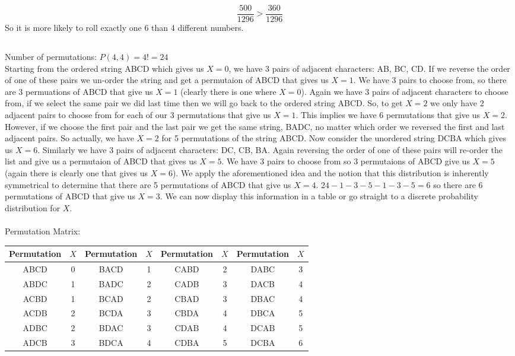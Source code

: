 \documentclass[]{article}
\begin{document}
$$ \frac{500}{1296} > \frac{360}{1296}$$
So it is more likely to roll exactly one 6 than 4 different numbers.
\subsection{}
Number of permutations: $P(4,4) = 4! = 24$ \\
Starting from the ordered string ABCD which gives us $X=0$, we have 3 pairs of adjacent characters: AB, BC, CD. If we reverse the order of one of these pairs we un-order the string and get a permutaion of ABCD that gives us $X = 1$. We have 3 pairs to choose from, so there are 3 permuations of ABCD that give us $X=1$ (clearly there is one where $X=0$). Again we have 3 pairs of adjacent characters to choose from, if we select the same pair we did last time then we will go back to the ordered string ABCD. So, to get $X=2$ we only have 2 adjacent pairs to choose from for each of our 3 permutations that give us $X=1$. This implies we have 6 permutations that give us $X=2$. However, if we choose the first pair and the last pair we get the same string, BADC, no matter which order we reversed the first and last adjacent pairs. So actually, we have $X=2$ for 5 permutations of the string ABCD. Now consider the unordered string DCBA which gives us $X=6$. Similarly we have 3 pairs of adjacent characters: DC, CB, BA. Again reversing the order of one of these pairs will re-order the list and give us a permutaion of ABCD that gives us $X=5$. We have 3 pairs to choose from so 3 permutaions of ABCD give us $X=5$ (again there is clearly one that gives us $X=6$). We apply the aforementioned idea and the notion that this distribution is inherently symmetrical to determine that there are 5 permutations of ABCD that give us $X=4$. $24 - 1 - 3 - 5 - 1 - 3 -5 = 6$ so there are 6 permutations of ABCD that give us $X=3$. We can now display this information in a table or go straight to a discrete probability distribution for $X$.
\\
\\
Permutation Matrix:
\begin{center}
\begin{tabular}{|c|c|c|c|c|c|c|c|}
	\hline
	Permutation & $X$ & Permutation & $X$ & Permutation & $X$ & Permutation & $X$ \\
	\hline
	ABCD & 0 & BACD & 1 & CABD & 2 & DABC & 3  \\
	\hline
	ABDC & 1 & BADC & 2 & CADB & 3 & DACB & 4  \\
	\hline
	ACBD & 1 & BCAD & 2 & CBAD & 3 & DBAC & 4  \\
	\hline
	ACDB & 2 & BCDA & 3 & CBDA & 4 & DBCA & 5  \\
	\hline
	ADBC & 2 & BDAC & 3 & CDAB & 4 & DCAB & 5  \\
	\hline
	ADCB & 3 & BDCA & 4 & CDBA & 5 & DCBA & 6  \\
	\hline
\end{tabular}
\end{center}
\end{document}
